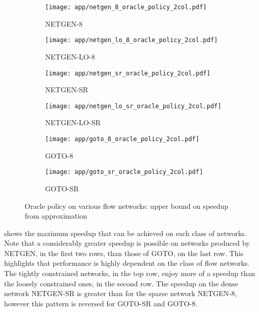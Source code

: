 \begin{figure}
    \begin{widepage}
    \begin{subfigure}[c]{0.5\textwidth}
        \texttt{[image: app/netgen\_8\_oracle\_policy\_2col.pdf]}
        \caption{NETGEN-8}
    \end{subfigure}
    \begin{subfigure}[c]{0.5\textwidth}
        \texttt{[image: app/netgen\_lo\_8\_oracle\_policy\_2col.pdf]}
        \caption{NETGEN-LO-8}
    \end{subfigure}
    \begin{subfigure}[c]{0.5\textwidth}
        \texttt{[image: app/netgen\_sr\_oracle\_policy\_2col.pdf]}
        \caption{NETGEN-SR}
    \end{subfigure}
    \begin{subfigure}[c]{0.5\textwidth}
        \texttt{[image: app/netgen\_lo\_sr\_oracle\_policy\_2col.pdf]}
        \caption{NETGEN-LO-SR}
    \end{subfigure}
    \begin{subfigure}[c]{0.5\textwidth}
        \texttt{[image: app/goto\_8\_oracle\_policy\_2col.pdf]}
        \caption{GOTO-8}
    \end{subfigure}
    \begin{subfigure}[c]{0.5\textwidth}
        \texttt{[image: app/goto\_sr\_oracle\_policy\_2col.pdf]}
        \caption{GOTO-SR}
    \end{subfigure}
    \end{widepage}
    \caption{Oracle policy on various flow networks: upper bound on speedup from approximation}
    \label{fig:app-general-oracle-policy}
\end{figure}

 shows the maximum speedup that can be achieved on each class of networks. Note that a considerably greater speedup is possible on networks produced by NETGEN, in the first two rows, than those of GOTO, on the last row. This highlights that performance is highly dependent on the class of flow networks. The tightly constrained networks, in the top row, enjoy more of a speedup than the loosely constrained ones, in the second row. The speedup on the dense network NETGEN-SR is greater than for the sparse network NETGEN-8, however this pattern is reversed for GOTO-SR and GOTO-8.

